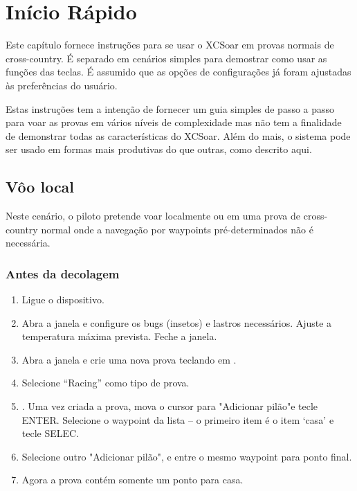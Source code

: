 \chapter{Início Rápido}\label{cha:quickstart}

Este capítulo fornece instruções para se usar o XCSoar em provas normais de cross-country.  É separado em cenários simples para demostrar como usar as funções das teclas.  É assumido que as opções de configurações já foram ajustadas às preferências do usuário.

Estas instruções tem a intenção de fornecer um guia simples de passo a passo para voar as provas em vários níveis de complexidade mas não tem a finalidade de demonstrar todas as características do XCSoar.  Além do mais, o sistema pode ser usado em formas mais produtivas do que outras, como descrito aqui.



\section{Vôo local}\label{sec:local-flight}

Neste cenário, o piloto pretende voar localmente ou em uma prova de cross-country normal onde a navegação por waypoints pré-determinados não é necessária.

\subsection*{Antes da decolagem}
\begin{enumerate}
\item  Ligue o dispositivo.
\item  Abra a janela  e configure os bugs (insetos) e lastros necessários.  Ajuste a temperatura máxima prevista.  Feche a janela.
\item  Abra a janela   e crie uma nova prova teclando em .
\item  Selecione  ``Racing'' como tipo de prova.
\item  .  Uma vez criada a prova, mova o cursor para "Adicionar pilão"e tecle ENTER.  Selecione o waypoint da lista – o primeiro item é o item ‘casa’ e tecle SELEC.  
\item Selecione outro "Adicionar pilão", e entre o mesmo waypoint para ponto final.
\item  Agora a prova contém somente um ponto para casa.
\end{enumerate}

